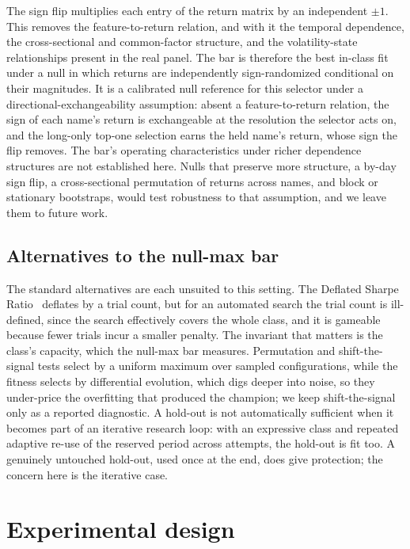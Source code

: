 \documentclass[11pt]{article}
\begin{document}
The sign flip multiplies each entry of the return matrix by an independent $\pm 1$. This removes the
feature-to-return relation, and with it the temporal dependence, the cross-sectional and common-factor
structure, and the volatility-state relationships present in the real panel. The bar is therefore the
best in-class fit under a null in which returns are independently sign-randomized conditional on their
magnitudes. It is a calibrated null reference for this selector under a directional-exchangeability
assumption: absent a feature-to-return relation, the sign of each name's return is exchangeable at the
resolution the selector acts on, and the long-only top-one selection earns the held name's return, whose
sign the flip removes. The bar's operating characteristics under richer dependence structures are not
established here. Nulls that preserve more structure, a by-day sign flip, a cross-sectional permutation of
returns across names, and block or stationary bootstraps, would test robustness to that assumption,
and we leave them to future work.

\subsection{Alternatives to the null-max bar}
\label{sec:whybar}

The standard alternatives are each unsuited to this setting. The Deflated Sharpe
Ratio~\cite{deflated} deflates by a trial count, but for an automated search the trial count is
ill-defined, since the search effectively covers the whole class, and it is gameable because fewer
trials incur a smaller penalty. The invariant that matters is the class's capacity, which the
null-max bar measures. Permutation and shift-the-signal tests select by a uniform maximum over
sampled configurations, while the fitness selects by differential evolution, which digs deeper into
noise, so they under-price the overfitting that produced the champion; we keep shift-the-signal only
as a reported diagnostic. A hold-out is not automatically sufficient when it becomes part of an
iterative research loop: with an expressive class and repeated adaptive re-use of the reserved period
across attempts, the hold-out is fit too. A genuinely untouched hold-out, used once at the end, does
give protection; the concern here is the iterative case.

\section{Experimental design}
\label{sec:design}
\end{document}
